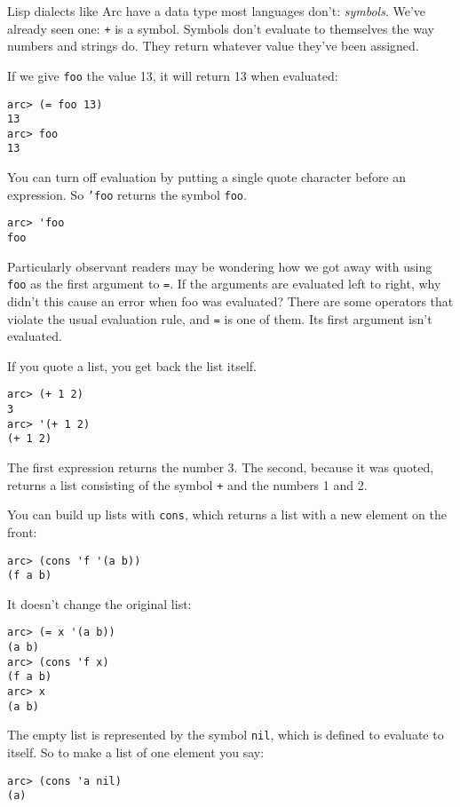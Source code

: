 \documentclass[a4paper,12pt]{book}
\begin{document}
{\sc{}Lisp} dialects like {\sc{}Arc} have a data type most languages don't:
{\em{}symbols}.  We've already seen one: {\tt+} is a symbol.  Symbols don't
evaluate to themselves the way numbers and strings do.  They return
whatever value they've been assigned.

If we give {\tt{}foo} the value 13, it will return 13 when evaluated:

\begin{verbatim}
arc> (= foo 13)
13
arc> foo
13
\end{verbatim}

You can turn off evaluation by putting a single quote character
before an expression.  So {\tt'foo} returns the symbol {\tt{}foo}.

\begin{verbatim}
arc> 'foo
foo
\end{verbatim}

Particularly observant readers may be wondering how we got away
with using {\tt{}foo} as the first argument to {\tt=}.  If the arguments are
evaluated left to right, why didn't this cause an error when foo
was evaluated?  There are some operators that violate the usual
evaluation rule, and {\tt=} is one of them.  Its first argument isn't
evaluated.

If you quote a list, you get back the list itself.  

\begin{verbatim}
arc> (+ 1 2)   
3
arc> '(+ 1 2)
(+ 1 2)
\end{verbatim}

The first expression returns the number 3.  The second, because it
was quoted, returns a list consisting of the symbol {\tt+} and the numbers
1 and 2.

You can build up lists with \verb|cons|, which returns a list with a new
element on the front:

\begin{verbatim}
arc> (cons 'f '(a b))
(f a b)
\end{verbatim}

It doesn't change the original list:

\begin{verbatim}
arc> (= x '(a b))
(a b)
arc> (cons 'f x)
(f a b)
arc> x
(a b)
\end{verbatim}

The empty list is represented by the symbol \verb|nil|, which is defined
to evaluate to itself.  So to make a list of one element you say:

\begin{verbatim}
arc> (cons 'a nil)
(a)
\end{verbatim}
\end{document}
